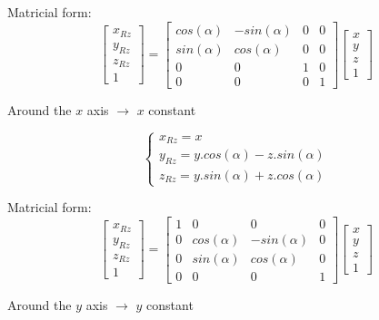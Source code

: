 \documentclass[a4paper]{article}
\begin{document}
\begin{flushleft}
Matricial form:
\begin{equation}
\begin{bmatrix}
	x_{Rz} \\
	y_{Rz} \\
	z_{Rz} \\
	1
\end{bmatrix}
=
\begin{bmatrix}
	cos(\alpha) & -sin(\alpha) & 0 & 0 \\
	sin(\alpha) & cos(\alpha) & 0 & 0 \\
	0 & 0 & 1 & 0 \\
	0 & 0 & 0 & 1
\end{bmatrix}
\begin{bmatrix}
	x \\
	y \\
	z \\
	1
\end{bmatrix}
\end{equation}

Around the $x$ axis $\rightarrow$ $x$ constant

\begin{equation}
\begin{cases}
	x_{Rz} = x \\
	y_{Rz} = y.cos(\alpha)-z.sin(\alpha) \\
	z_{Rz} = y.sin(\alpha)+z.cos(\alpha)
\end{cases}
\end{equation}

Matricial form:
\begin{equation}
\begin{bmatrix}
	x_{Rz} \\
	y_{Rz} \\
	z_{Rz} \\
	1
\end{bmatrix}
=
\begin{bmatrix}
	1 & 0 & 0 & 0 \\
	0 & cos(\alpha) & -sin(\alpha) & 0 \\
	0 & sin(\alpha) & cos(\alpha) & 0  \\
	0 & 0 & 0 & 1
\end{bmatrix}
\begin{bmatrix}
	x \\
	y \\
	z \\
	1
\end{bmatrix}
\end{equation}

Around the $y$ axis $\rightarrow$ $y$ constant


\end{flushleft}
\end{document}
